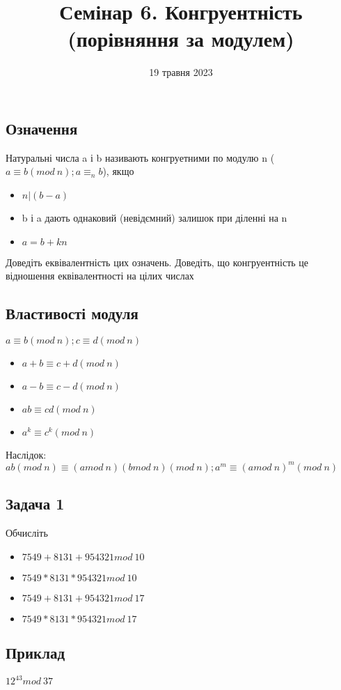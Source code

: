 \documentclass{article}
\begin{document}
\title{Семінар 6. Конгруентність (порівняння за модулем)}
\date{19 травня 2023}

\maketitle

\subsection*{Означення}
Натуральні числа a і b називають конгруетними по модулю n ($a \equiv b (mod\ n); a \equiv_n b$), якщо
\begin{itemize}
    \item $n|(b-a)$
    \item b і a дають однаковий (невідємний) залишок при діленні на n
    \item $a = b + kn$
\end{itemize}
Доведіть еквівалентність цих означень. Доведіть, що конгруентність це відношення еквівалентності на цілих числах

\subsection*{Властивості модуля}
$a \equiv b (mod\ n); c \equiv d (mod\ n)$
\begin{itemize}
    \item $a+b \equiv c+d (mod\ n)$
    \item $a-b \equiv c-d (mod\ n)$
    \item $ab \equiv cd (mod\ n)$
    \item $a^k \equiv c^k (mod\ n)$
\end{itemize}
Наслідок: $ab (mod\ n) \equiv (a mod\ n)(b mod\ n) (mod\ n); a^m \equiv (a mod\ n)^m (mod\ n)$

\subsection*{Задача 1}
Обчисліть
\begin{itemize}
    \item $7549 + 8131 + 954321 mod\ 10$
    \item $7549*8131*954321 mod\ 10$
    \item $7549 + 8131 + 954321 mod\ 17$
    \item $7549*8131*954321 mod\ 17$
\end{itemize}

\subsection*{Приклад}
$12^{43} mod\ 37$
\end{document}
